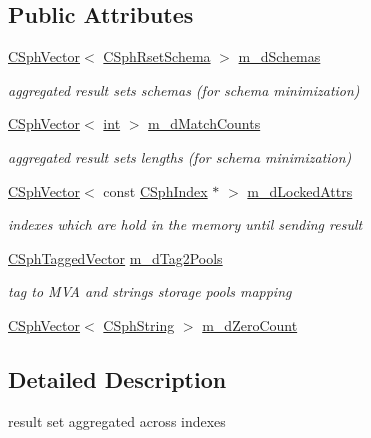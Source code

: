 \subsection*{Public Attributes}
\begin{DoxyCompactItemize}
\item 
\hyperlink{classCSphVector}{C\-Sph\-Vector}$<$ \hyperlink{classCSphRsetSchema}{C\-Sph\-Rset\-Schema} $>$ \hyperlink{structAggrResult__t_a52e63e87c90a4428ca009c0ecb3c0390}{m\-\_\-d\-Schemas}
\begin{DoxyCompactList}\small\item\em aggregated result sets schemas (for schema minimization) \end{DoxyCompactList}\item 
\hyperlink{classCSphVector}{C\-Sph\-Vector}$<$ \hyperlink{sphinxexpr_8cpp_a4a26e8f9cb8b736e0c4cbf4d16de985e}{int} $>$ \hyperlink{structAggrResult__t_a8fb4c9631dfc7f05b1a17a0fdcc1a83d}{m\-\_\-d\-Match\-Counts}
\begin{DoxyCompactList}\small\item\em aggregated result sets lengths (for schema minimization) \end{DoxyCompactList}\item 
\hyperlink{classCSphVector}{C\-Sph\-Vector}$<$ const \hyperlink{classCSphIndex}{C\-Sph\-Index} $\ast$ $>$ \hyperlink{structAggrResult__t_a04227b919acd8a0b925b912a9991df0c}{m\-\_\-d\-Locked\-Attrs}
\begin{DoxyCompactList}\small\item\em indexes which are hold in the memory until sending result \end{DoxyCompactList}\item 
\hyperlink{classCSphTaggedVector}{C\-Sph\-Tagged\-Vector} \hyperlink{structAggrResult__t_ae2309ab0f12f4558435075b96f463084}{m\-\_\-d\-Tag2\-Pools}
\begin{DoxyCompactList}\small\item\em tag to M\-V\-A and strings storage pools mapping \end{DoxyCompactList}\item 
\hyperlink{classCSphVector}{C\-Sph\-Vector}$<$ \hyperlink{structCSphString}{C\-Sph\-String} $>$ \hyperlink{structAggrResult__t_a5b6c26a144fa7054522ef8f52f14e06a}{m\-\_\-d\-Zero\-Count}
\end{DoxyCompactItemize}


\subsection{Detailed Description}
result set aggregated across indexes 

